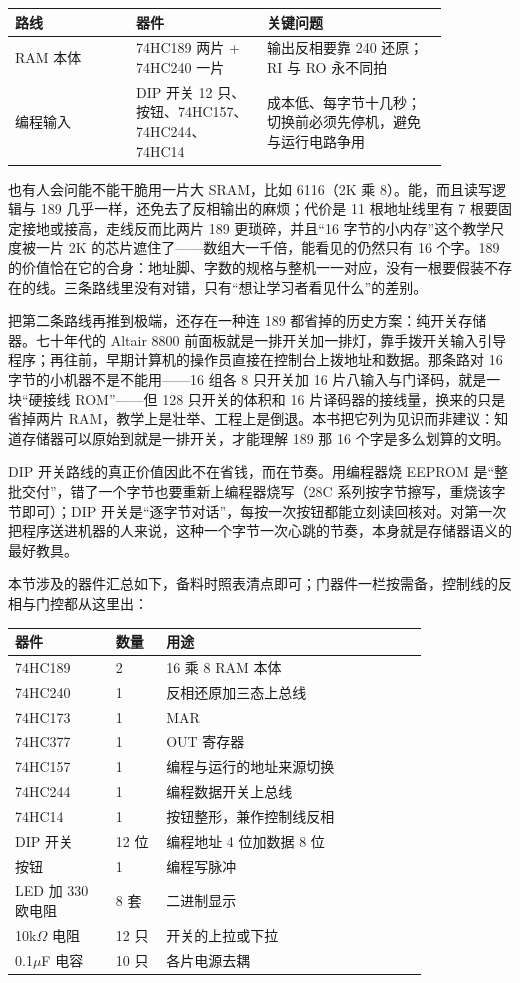 \begin{longtable}{L{0.24\linewidth}L{0.26\linewidth}L{0.36\linewidth}}
\toprule
路线 & 器件 & 关键问题 \\
\midrule
RAM 本体 & 74HC189 两片 + 74HC240 一片 & 输出反相要靠 240 还原；RI 与 RO 永不同拍 \\
编程输入 & DIP 开关 12 只、按钮、74HC157、74HC244、74HC14 & 成本低、每字节十几秒；切换前必须先停机，避免与运行电路争用 \\
\bottomrule
\end{longtable}

也有人会问能不能干脆用一片大 SRAM，比如 6116（2K 乘 8）。能，而且读写逻辑与 189 几乎一样，还免去了反相输出的麻烦；代价是 11 根地址线里有 7 根要固定接地或接高，走线反而比两片 189 更琐碎，并且“16 字节的小内存”这个教学尺度被一片 2K 的芯片遮住了——数组大一千倍，能看见的仍然只有 16 个字。189 的价值恰在它的合身：地址脚、字数的规格与整机一一对应，没有一根要假装不存在的线。三条路线里没有对错，只有“想让学习者看见什么”的差别。

把第二条路线再推到极端，还存在一种连 189 都省掉的历史方案：纯开关存储器。七十年代的 Altair 8800 前面板就是一排开关加一排灯，靠手拨开关输入引导程序；再往前，早期计算机的操作员直接在控制台上拨地址和数据。那条路对 16 字节的小机器不是不能用——16 组各 8 只开关加 16 片八输入与门译码，就是一块“硬接线 ROM”——但 128 只开关的体积和 16 片译码器的接线量，换来的只是省掉两片 RAM，教学上是壮举、工程上是倒退。本书把它列为见识而非建议：知道存储器可以原始到就是一排开关，才能理解 189 那 16 个字是多么划算的文明。

DIP 开关路线的真正价值因此不在省钱，而在节奏。用编程器烧 EEPROM 是“整批交付”，错了一个字节也要重新上编程器烧写（28C 系列按字节擦写，重烧该字节即可）；DIP 开关是“逐字节对话”，每按一次按钮都能立刻读回核对。对第一次把程序送进机器的人来说，这种一个字节一次心跳的节奏，本身就是存储器语义的最好教具。

本节涉及的器件汇总如下，备料时照表清点即可；门器件一栏按需备，控制线的反相与门控都从这里出：

\begin{longtable}{L{0.20\linewidth}L{0.10\linewidth}L{0.52\linewidth}}
\toprule
器件 & 数量 & 用途 \\
\midrule
74HC189 & 2 & 16 乘 8 RAM 本体 \\
74HC240 & 1 & 反相还原加三态上总线 \\
74HC173 & 1 & MAR \\
74HC377 & 1 & OUT 寄存器 \\
74HC157 & 1 & 编程与运行的地址来源切换 \\
74HC244 & 1 & 编程数据开关上总线 \\
74HC14 & 1 & 按钮整形，兼作控制线反相 \\
DIP 开关 & 12 位 & 编程地址 4 位加数据 8 位 \\
按钮 & 1 & 编程写脉冲 \\
LED 加 330 欧电阻 & 8 套 & 二进制显示 \\
10k$\Omega$ 电阻 & 12 只 & 开关的上拉或下拉 \\
0.1$\mu$F 电容 & 10 只 & 各片电源去耦 \\
\bottomrule
\end{longtable}

